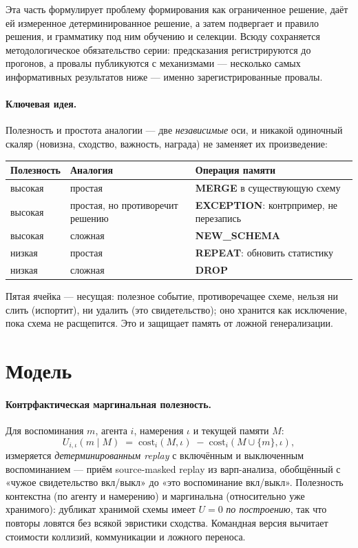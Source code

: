 \documentclass{article}
\begin{document}
Эта часть формулирует проблему формирования как ограниченное
решение, даёт ей измеренное детерминированное решение, а затем
подвергает и правило решения, и грамматику под ним обучению и
селекции. Всюду сохраняется методологическое обязательство серии:
предсказания регистрируются до прогонов, а провалы публикуются с
механизмами --- несколько самых информативных результатов ниже ---
именно зарегистрированные провалы.

\paragraph{Ключевая идея.} Полезность и простота аналогии --- две
\emph{независимые} оси, и никакой одиночный скаляр (новизна,
сходство, важность, награда) не заменяет их произведение:

\begin{center}
\small
\begin{tabular}{lll}
\toprule
Полезность & Аналогия & Операция памяти \\
\midrule
высокая & простая & \textbf{MERGE} в существующую схему \\
высокая & простая, но противоречит решению & \textbf{EXCEPTION}:
контрпример, не перезапись \\
высокая & сложная & \textbf{NEW\_SCHEMA} \\
низкая & простая & \textbf{REPEAT}: обновить статистику \\
низкая & сложная & \textbf{DROP} \\
\bottomrule
\end{tabular}
\end{center}

Пятая ячейка --- несущая: полезное событие, противоречащее схеме,
нельзя ни слить (испортит), ни удалить (это свидетельство); оно
хранится как исключение, пока схема не расщепится. Это и защищает
память от ложной генерализации.

\section{Модель}
\label{sec:model}

\paragraph{Контрфактическая маргинальная полезность.} Для
воспоминания $m$, агента $i$, намерения $\iota$ и текущей памяти $M$:
\[
U_{i,\iota}(m \mid M) \;=\;
\mathrm{cost}_i(M, \iota) \;-\; \mathrm{cost}_i(M \cup \{m\}, \iota),
\]
измеряется \emph{детерминированным replay} с включённым и выключенным
воспоминанием --- приём source-masked replay из варп-анализа,
обобщённый с «чужое свидетельство вкл/выкл» до «это воспоминание
вкл/выкл». Полезность контекстна (по агенту и намерению) и
маргинальна (относительно уже хранимого): дубликат хранимой схемы
имеет $U = 0$ \emph{по построению}, так что повторы ловятся без
всякой эвристики сходства. Командная версия вычитает стоимости
коллизий, коммуникации и ложного переноса.
\end{document}
